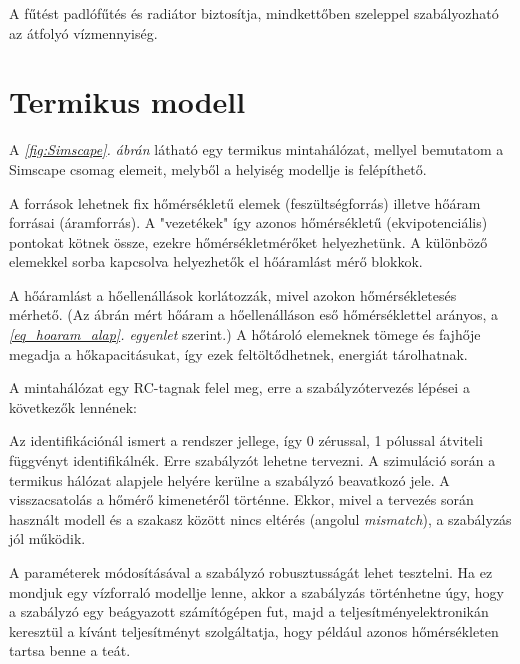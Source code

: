A fűtést padlófűtés és radiátor biztosítja, mindkettőben szeleppel szabályozható az átfolyó vízmennyiség.

\section{Termikus modell}

A \textit{\ref{fig:Simscape}. ábrán} látható egy termikus mintahálózat, mellyel bemutatom a Simscape csomag elemeit, melyből a helyiség modellje is felépíthető.

A források lehetnek fix hőmérsékletű elemek (feszültségforrás) illetve hőáram forrásai (áramforrás).
A "vezetékek" így azonos hőmérsékletű (ekvipotenciális) pontokat kötnek össze, ezekre hőmérsékletmérőket helyezhetünk. A különböző elemekkel sorba kapcsolva helyezhetők el hőáramlást mérő blokkok.

A hőáramlást a hőellenállások korlátozzák, mivel azokon hőmérsékletesés mérhető. (Az ábrán mért hőáram a hőellenálláson eső hőmérséklettel arányos, a \textit{\ref{eq_hoaram_alap}. egyenlet} szerint.) A hőtároló elemeknek tömege és fajhője megadja a hőkapacitásukat, így ezek feltöltődhetnek, energiát tárolhatnak.


A mintahálózat egy RC-tagnak felel meg, erre a szabályzótervezés lépései a következők lennének:

Az identifikációnál ismert a rendszer jellege, így 0 zérussal, 1 pólussal átviteli függvényt identifikálnék.
Erre szabályzót lehetne tervezni. A szimuláció során a termikus hálózat alapjele helyére kerülne a szabályzó beavatkozó jele. A visszacsatolás a hőmérő kimenetéről történne. Ekkor, mivel a tervezés során használt modell és a  szakasz között nincs eltérés (angolul \textit{mismatch}), a szabályzás jól működik.

A paraméterek módosításával a szabályzó robusztusságát lehet tesztelni. Ha ez mondjuk egy vízforraló modellje lenne, akkor a szabályzás történhetne úgy, hogy a szabályzó egy beágyazott számítógépen fut, majd a teljesítményelektronikán keresztül a kívánt teljesítményt szolgáltatja, hogy például azonos hőmérsékleten tartsa benne a teát.

